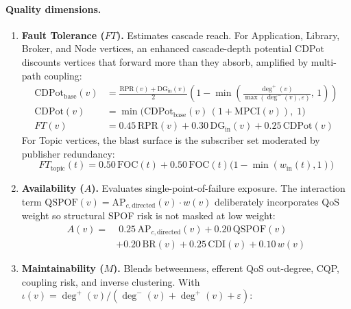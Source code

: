 \paragraph{Quality dimensions.}
\begin{enumerate}
    \item \textbf{Fault Tolerance ($FT$).} Estimates cascade reach. For Application, Library, Broker, and Node vertices, an enhanced cascade-depth potential $\mathrm{CDPot}$ discounts vertices that forward more than they absorb, amplified by multi-path coupling:
    \begin{equation}
    \begin{aligned}
    \mathrm{CDPot}_{\text{base}}(v) &= \frac{\mathrm{RPR}(v) + \mathrm{DG}_{\text{in}}(v)}{2}\left(1 - \min\!\left(\frac{\deg^{+}(v)}{\max(\deg^{-}(v),\varepsilon)},\, 1\right)\right) \\
    \mathrm{CDPot}(v) &= \min\!\big(\mathrm{CDPot}_{\text{base}}(v)\,(1 + \mathrm{MPCI}(v)),\; 1\big) \\
    FT(v) &= 0.45\,\mathrm{RPR}(v) + 0.30\,\mathrm{DG}_{\text{in}}(v) + 0.25\,\mathrm{CDPot}(v)
    \end{aligned}
    \end{equation}
    For Topic vertices, the blast surface is the subscriber set moderated by publisher redundancy:
    \begin{equation}
    FT_{\text{topic}}(t) = 0.50\,\mathrm{FOC}(t) + 0.50\,\mathrm{FOC}(t)\big(1 - \min(w_{\text{in}}(t), 1)\big)
    \end{equation}
    \item \textbf{Availability ($A$).} Evaluates single-point-of-failure exposure. The interaction term $\mathrm{QSPOF}(v) = \mathrm{AP}_{c,\text{directed}}(v)\cdot w(v)$ deliberately incorporates QoS weight so structural SPOF risk is not masked at low weight:
    \begin{equation}
    \begin{aligned}
    A(v) = & \; 0.25\,\mathrm{AP}_{c,\text{directed}}(v) + 0.20\,\mathrm{QSPOF}(v) \\
           & + 0.20\,\mathrm{BR}(v) + 0.25\,\mathrm{CDI}(v) + 0.10\,w(v)
    \end{aligned}
    \end{equation}
    \item \textbf{Maintainability ($M$).} Blends betweenness, efferent QoS out-degree, CQP, coupling risk, and inverse clustering. With $\iota(v) = \deg^{+}(v) / (\deg^{-}(v) + \deg^{+}(v) + \varepsilon)$:
    \begin{equation}

\end{equation}
\end{enumerate}
